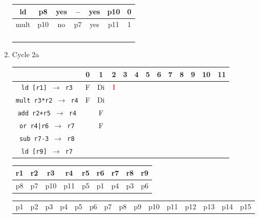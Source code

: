 \documentclass[12pt]{article}
\begin{document}
\begin{enumerate}
\begin{table}[H]
\begin{tabular}{|c|c|c|c|c|c|c|}
					\hline
					ld & p8 & yes & -- & yes & p10 & 0\\
					\hline
					mult & p10 & no & p7 & yes & p11 & 1\\
					\hline
					 &  &  &  &  &  & \\
					\hline
					 &  &  &  &  &  & \\
					\hline
					 &  &  &  &  &  & \\
					\hline
					 &  &  &  &  &  & \\
					\hline
				\end{tabular}
			\end{table}
		\item
			Cycle 2a
			\begin{table}[H]
				\begin{tabular}{|c|c|c|c|c|c|c|c|c|c|c|c|c|}
					\hline
					 & 0 & 1 & 2 & 3 & 4 & 5 & 6 & 7 & 8 & 9 & 10 & 11\\
					\hline
					\texttt{ld [r1] $\rightarrow$ r3} & F & Di & \textcolor{red}{I} &  &  &  &  &  &  &  &  &\\
					\hline
					\texttt{mult r3*r2 $\rightarrow$ r4} & F & Di &  &  &  &  &  &  &  &  &  &\\
					\hline
					\texttt{add r2+r5 $\rightarrow$ r4} &  & F &  &  &  &  &  &  &  &  &  &\\
					\hline
					\texttt{or r4|r6 $\rightarrow$ r7} &  & F &  &  &  &  &  &  &  &  &  &\\
					\hline
					\texttt{sub r7-3 $\rightarrow$ r8} &  &  &  &  &  &  &  &  &  &  &  &\\
					\hline
					\texttt{ld [r9] $\rightarrow$ r7} &  &  &  &  &  &  &  &  &  &  &  &\\
					\hline 
				\end{tabular}
			\end{table}
			\begin{table}[H]
				\begin{tabular}{|c|c|c|c|c|c|c|c|c|}
					\hline
					r1 & r2 & r3 & r4 & r5 & r6 & r7 & r8 & r9\\
					\hline
					p8 & p7 & p10 & p11 & p5 & p1 & p4 & p3 & p6\\
					\hline
				\end{tabular}
			\end{table}
			\begin{table}[H]
				\begin{tabular}{|c|c|c|c|c|c|c|c|c|c|c|c|c|c|c|}
					\hline
					p1 & p2 & p3 & p4 & p5 & p6 & p7 & p8 & p9 & p10 & p11 & p12 & p13 & p14 & p15\\

\end{tabular}
\end{table}
\end{enumerate}
\end{document}
